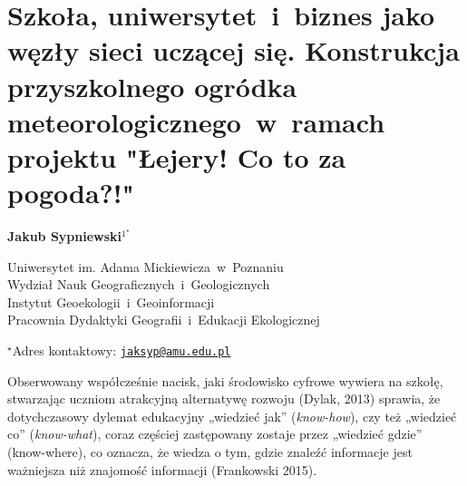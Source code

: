 \documentclass[\main/boa.tex]{subfiles}
\begin{document}
\sloppy


\section{Szkoła, uniwersytet~i~biznes jako węzły sieci uczącej się. Konstrukcja przyszkolnego ogródka meteorologicznego~w~ramach projektu "Łejery! Co to za pogoda?!"}

\begin{center}
  {\bf {} Jakub Sypniewski$^{1^\star}$}
\end{center}

\vskip 0.3cm

\begin{affiliations}
\begin{enumerate}
\begin{minipage}{0.915\textwidth}
\centering
\item Uniwersytet im. Adama Mickiewicza~w~Poznaniu\\ Wydział Nauk Geograficznych~i~Geologicznych\\ Instytut Geoekologii~i~Geoinformacji \\ Pracownia Dydaktyki Geografii~i~Edukacji Ekologicznej\\[-2pt]
\end{minipage}
\end{enumerate}
$^\star$Adres kontaktowy: \href{mailto:jaksyp@amu.edu.pl}{\nolinkurl{jaksyp@amu.edu.pl}}\\
\end{affiliations}

\vskip 0.5cm


\vskip 0.5cm

Obserwowany współcześnie nacisk, jaki środowisko cyfrowe wywiera na szkołę, stwarzając uczniom atrakcyjną alternatywę rozwoju (Dylak, 2013) sprawia, że dotychczasowy dylemat edukacyjny „wiedzieć jak” (\emph{know-how}), czy też „wiedzieć co” (\emph{know-what}), coraz częściej zastępowany zostaje przez „wiedzieć gdzie”  (know-where), co oznacza, że wiedza o tym, gdzie znaleźć informacje jest ważniejsza niż znajomość informacji (Frankowski 2015).
\end{document}
